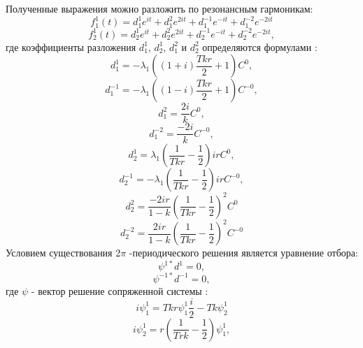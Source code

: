 \documentclass[12pt]{article}
\begin{document}
Полученные выражения можно разложить по резонансным гармоникам:
 \begin{equation}
      f^1_1(t)=d^1_1 e^{i t}+d^2_1 e^{2 i t} +d^{-1}_1e^{-i t}+d^{-2}_1 e^{-2 i t}
    \end{equation}
    \begin{equation*}
      f^1_2(t)=d^1_2 e^{i t}+d^2_2 e^{2 i t} +d^{-1}_2e^{-i t}+d^{-2}_2 e^{-2 i t},
    \end{equation*}
где коэффициенты разложения $ d^1_1 $, $ d^1_2 $, $ d^2_1$ и $d^2_2$ определяются формулами :
\begin{equation*}
    d^1_1=-\lambda_1 \left((1+i)\frac{T k r}{2} + 1\right) C^0,
\end{equation*}
\begin{equation*}
    d^{-1}_1=-\lambda_1 \left((1-i)\frac{T k r}{2} + 1\right) C^{-0},
\end{equation*}
\begin{equation*}
    d^2_1=\frac{2i}{k} C^0,
\end{equation*}
\begin{equation*}
    d^{-2}_1=\frac{-2i}{k} C^{-0},
\end{equation*}
\begin{equation*}
    d^1_2=\lambda_1 \left ( \frac{1}{T k r}-\frac{1}{2} \right) i r C^0,
\end{equation*}
\begin{equation*}
    d^{-1}_2=-\lambda_1 \left ( \frac{1}{T k r}-\frac{1}{2} \right) i r C^{-0},
\end{equation*}
\begin{equation*}
    d^2_2=\frac{-2i r}{1-k} \left ( \frac{1}{T k r}-\frac{1}{2} \right)^2 C^0
\end{equation*}
\begin{equation*}
    d^{-2}_2=\frac{2i r}{1-k} \left ( \frac{1}{T k r}-\frac{1}{2} \right)^2 C^{-0}
\end{equation*}
Условием существования 2$\pi$ -периодического решения является уравнение отбора:
\begin{equation*}
    \psi^{1*} d^1 =0,
\end{equation*}
\begin{equation*}
    \psi^{-1*} d^{-1} =0,
\end{equation*}
где $\psi$ - вектор решение сопряженной системы  :
 \begin{equation*}
     i \psi_1^1=T k r \psi_1^1 \frac{i}{2}- T k \psi_2^1
 \end{equation*}
 \begin{equation*}
     i \psi_2^1=r \left(  \frac{1}{T r k} - \frac{1}{2}\right) \psi_1^1 ,
 \end{equation*}
\end{document}
